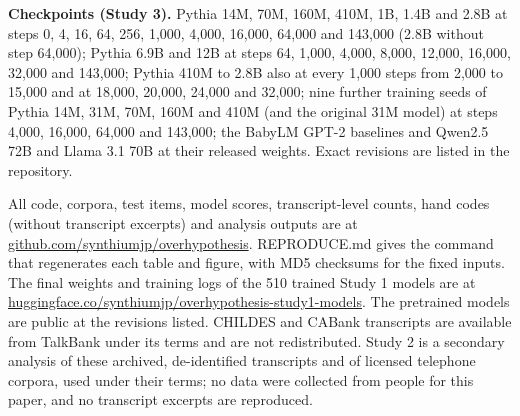\textbf{Checkpoints (Study 3).} Pythia 14M, 70M, 160M, 410M, 1B, 1.4B and 2.8B at steps 0, 4, 16, 64, 256, 1,000, 4,000, 16,000, 64,000 and 143,000 (2.8B without step 64,000); Pythia 6.9B and 12B at steps 64, 1,000, 4,000, 8,000, 12,000, 16,000, 32,000 and 143,000; Pythia 410M to 2.8B also at every 1,000 steps from 2,000 to 15,000 and at 18,000, 20,000, 24,000 and 32,000; nine further training seeds of Pythia 14M, 31M, 70M, 160M and 410M (and the original 31M model) at steps 4,000, 16,000, 64,000 and 143,000; the BabyLM GPT-2 baselines and Qwen2.5 72B and Llama 3.1 70B at their released weights. Exact revisions are listed in the repository.

\FloatBarrier
{}\label{app:H}
\setcounter{table}{0}\renewcommand{\thetable}{H\arabic{table}}
\setcounter{figure}{0}\renewcommand{\thefigure}{H\arabic{figure}}
All code, corpora, test items, model scores, transcript-level counts, hand codes (without transcript excerpts) and analysis outputs are at \url{github.com/synthiumjp/overhypothesis}. REPRODUCE.md gives the command that regenerates each table and figure, with MD5 checksums for the fixed inputs. The final weights and training logs of the 510 trained Study 1 models are at \url{huggingface.co/synthiumjp/overhypothesis-study1-models}. The pretrained models are public at the revisions listed. CHILDES and CABank transcripts are available from TalkBank under its terms and are not redistributed. Study 2 is a secondary analysis of these archived, de-identified transcripts and of licensed telephone corpora, used under their terms; no data were collected from people for this paper, and no transcript excerpts are reproduced.
